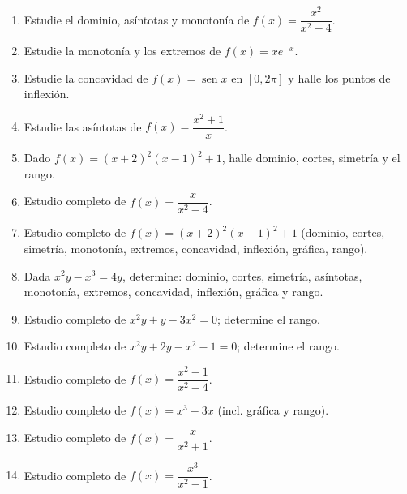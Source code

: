 \documentclass[12pt, letterpaper]{article}
\begin{document}
\begin{enumerate}[leftmargin=*]
  \item \dificil{} Estudie el dominio, asíntotas y monotonía de $f(x) = \dfrac{x^2}{x^2 - 4}$.

  \item \dificil{} Estudie la monotonía y los extremos de $f(x) = x e^{-x}$.

  \item \dificil{} Estudie la concavidad de $f(x) = \operatorname{sen} x$ en $[0, 2\pi]$ y halle los puntos de inflexión.

  \item \dificil{} Estudie las asíntotas de $f(x) = \dfrac{x^2 + 1}{x}$.

  \item \dificil{} Dado $f(x) = (x+2)^2(x-1)^2 + 1$, halle dominio, cortes, simetría y el rango. %

  \item \muyDificil{} Estudio completo de $f(x) = \dfrac{x}{x^2 - 4}$. %

  \item \muyDificil{} Estudio completo de $f(x) = (x+2)^2(x-1)^2 + 1$ (dominio, cortes, simetría, monotonía, extremos, concavidad, inflexión, gráfica, rango). %

  \item \muyDificil{} Dada $x^2 y - x^3 = 4y$, determine: dominio, cortes, simetría, asíntotas, monotonía, extremos, concavidad, inflexión, gráfica y rango. %

  \item \muyDificil{} Estudio completo de $x^2 y + y - 3x^2 = 0$; determine el rango. %

  \item \muyDificil{} Estudio completo de $x^2 y + 2y - x^2 - 1 = 0$; determine el rango. %

  \item \muyDificil{} Estudio completo de $f(x) = \dfrac{x^2 - 1}{x^2 - 4}$.

  \item \muyDificil{} Estudio completo de $f(x) = x^3 - 3x$ (incl. gráfica y rango).

  \item \muyDificil{} Estudio completo de $f(x) = \dfrac{x}{x^2 + 1}$.

  \item \muyDificil{} Estudio completo de $f(x) = \dfrac{x^3}{x^2 - 1}$.

\end{enumerate}
\end{document}
